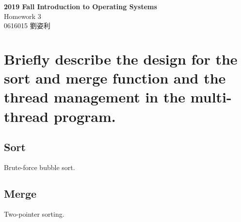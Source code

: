 \documentclass[12pt, a4paper]{article}
\title{
    \textbf{Report Title} \\
    \large Report Subtitle \\
    \small Tracy Liu
    \author Tracy Liu
    \date{}
}
\begin{document}
    \begin{CJK*}{UTF8}{bsmi}

    \begin{center}
        \LARGE\textbf{2019 Fall Introduction to Operating Systems} \\
        \large Homework 3 \\
        \small 0616015 劉姿利 \\
    \end{center}


    \section{Briefly describe the design for the sort and merge function and the thread management in the multi-thread program.}
        \subsection{Sort}
            Brute-force bubble sort.

        \subsection{Merge}
            Two-pointer sorting.


\end{CJK*}
\end{document}
